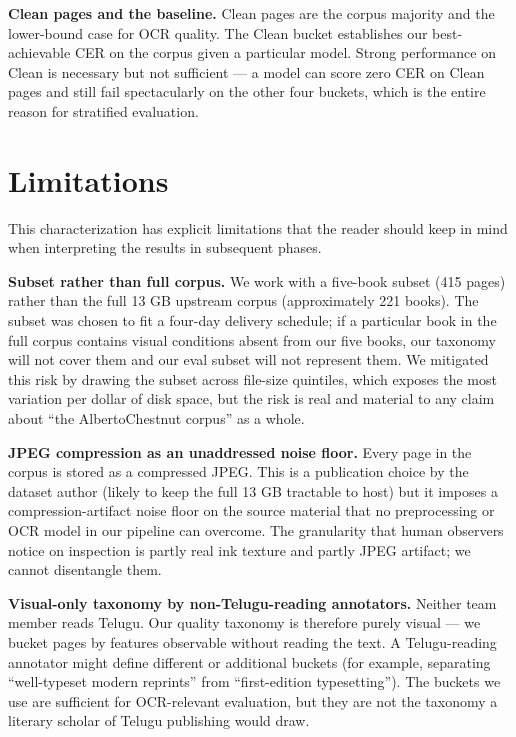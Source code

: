 \documentclass[
  letterpaper,
  DIV=11,
  numbers=noendperiod]{scrartcl}
\begin{document}
\textbf{Clean pages and the baseline.} Clean pages are the corpus
majority and the lower-bound case for OCR quality. The Clean bucket
establishes our best-achievable CER on the corpus given a particular
model. Strong performance on Clean is necessary but not sufficient --- a
model can score zero CER on Clean pages and still fail spectacularly on
the other four buckets, which is the entire reason for stratified
evaluation.

\section{Limitations}\label{limitations}

This characterization has explicit limitations that the reader should
keep in mind when interpreting the results in subsequent phases.

\textbf{Subset rather than full corpus.} We work with a five-book subset
(415 pages) rather than the full 13 GB upstream corpus (approximately
221 books). The subset was chosen to fit a four-day delivery schedule;
if a particular book in the full corpus contains visual conditions
absent from our five books, our taxonomy will not cover them and our
eval subset will not represent them. We mitigated this risk by drawing
the subset across file-size quintiles, which exposes the most variation
per dollar of disk space, but the risk is real and material to any claim
about ``the AlbertoChestnut corpus'' as a whole.

\textbf{JPEG compression as an unaddressed noise floor.} Every page in
the corpus is stored as a compressed JPEG. This is a publication choice
by the dataset author (likely to keep the full 13 GB tractable to host)
but it imposes a compression-artifact noise floor on the source material
that no preprocessing or OCR model in our pipeline can overcome. The
granularity that human observers notice on inspection is partly real ink
texture and partly JPEG artifact; we cannot disentangle them.

\textbf{Visual-only taxonomy by non-Telugu-reading annotators.} Neither
team member reads Telugu. Our quality taxonomy is therefore purely
visual --- we bucket pages by features observable without reading the
text. A Telugu-reading annotator might define different or additional
buckets (for example, separating ``well-typeset modern reprints'' from
``first-edition typesetting''). The buckets we use are sufficient for
OCR-relevant evaluation, but they are not the taxonomy a literary
scholar of Telugu publishing would draw.
\end{document}
